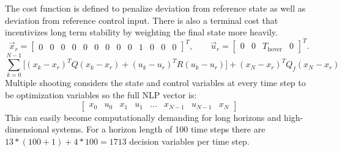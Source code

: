\documentclass[]{article}
\begin{document}
The cost function is defined to penalize deviation from reference state as well as deviation from reference control input. There is also a terminal cost that incentivizes long term stability by weighting the final state more heavily.
        \[
        \vec{x}_r =
        \begin{bmatrix}
        0 & 0 & 0 & 0 & 0 & 0 & 0 & 0 & 0 & 1 & 0 & 0 & 0
        \end{bmatrix}^{\!T},
        \qquad
        \vec{u}_r =
        \begin{bmatrix}
        0 & 0 & T_{\text{hover}} & 0
        \end{bmatrix}^{\!T}.
        \]
         \begin{equation}
         	 \sum_{k=0}^{N-1}  \Big[(x_k -  x_{r})^T Q (x_k - x_{r}) + (u_k -  u_{r})^T R (u_k - u_{r}) \Big] + (x_N -  x_{r})^T Q_f (x_N - x_{r})
         \end{equation}
Multiple shooting considers the state and control variables at every time step to be optimization variables so the full NLP vector is:
        \[
        \begin{bmatrix}
        x_0 & u_0 & x_1 & u_1 & ... & x_{N-1} & u_{N-1} & x_N
        \end{bmatrix}
        \]
This can easily become computationally demanding for long horizons and high-dimensional systems. For a horizon length of 100 time steps there are $13 * (100+1)+4*100=1713$ decision variables per time step.
 
\end{document}
